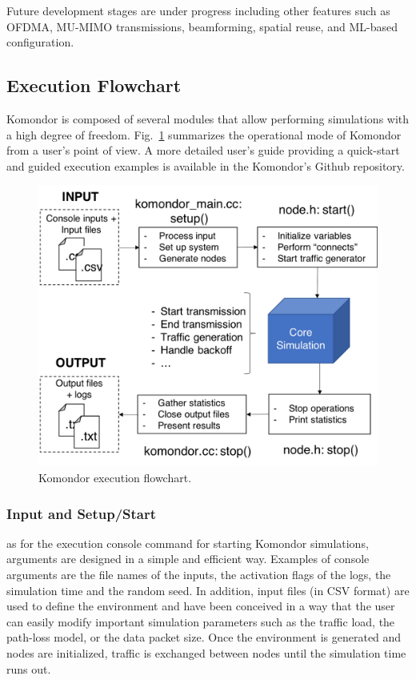 \documentclass{article}
\begin{document}
	Future development stages are under progress including other features such as OFDMA, MU-MIMO transmissions, beamforming, spatial reuse, and ML-based configuration.
	
	\subsection{Execution Flowchart}
	\label{subsection:flowchart}
	Komondor is composed of several modules that allow performing simulations with a high degree of freedom. Fig.~\ref{fig:komondor_flowchart} summarizes the operational mode of Komondor from a user's point of view. A more detailed user's guide providing a quick-start and guided execution examples is available in the Komondor's Github repository.
	
	\begin{figure}[t]
		\centering
		\includegraphics[width=0.9\columnwidth]{komondor_flowchart_helvetica.png}
		\caption{Komondor execution flowchart.}
		\label{fig:komondor_flowchart}
	\end{figure}		
	
	\subsubsection{Input and Setup/Start}
	as for the execution console command for starting Komondor simulations, arguments are designed in a simple and efficient way. Examples of console arguments are the file names of the inputs, the activation flags of the logs, the simulation time and the random seed. In addition, input files (in CSV format) are used to define the environment and have been conceived in a way that the user can easily modify important simulation parameters such as the traffic load, the path-loss model, or the data packet size.
	Once the environment is generated and nodes are initialized, traffic is exchanged between nodes until the simulation time runs out.
	
\end{document}
